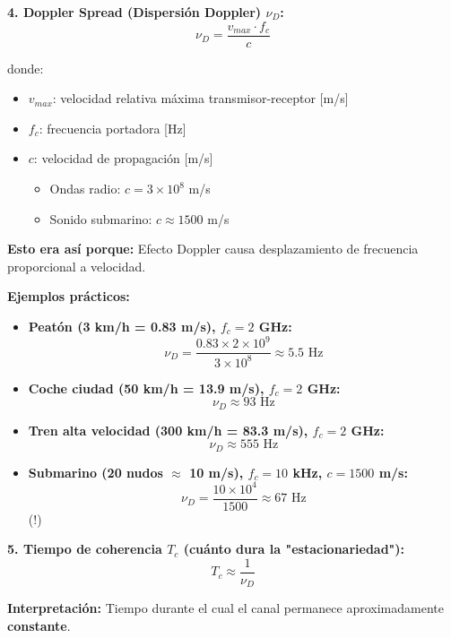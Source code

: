 \documentclass[10pt,a4paper]{article}
\begin{document}
\begin{tcolorbox}[colback=rojoclaro!10,colframe=rojoclaro,title=🚀 Parámetros por MOVILIDAD (Doppler)]
\textbf{4. Doppler Spread (Dispersión Doppler) $\nu_D$:}
$$\boxed{\nu_D = \frac{v_{max} \cdot f_c}{c}}$$

donde:
\begin{itemize}
\item $v_{max}$: velocidad relativa máxima transmisor-receptor [m/s]
\item $f_c$: frecuencia portadora [Hz]
\item $c$: velocidad de propagación [m/s]
  \begin{itemize}
  \item Ondas radio: $c = 3 \times 10^8$ m/s
  \item Sonido submarino: $c \approx 1500$ m/s
  \end{itemize}
\end{itemize}

\textbf{Esto era así porque:} Efecto Doppler causa desplazamiento de frecuencia proporcional a velocidad.

\textbf{Ejemplos prácticos:}
\begin{itemize}
\item \textbf{Peatón (3 km/h = 0.83 m/s), $f_c = 2$ GHz:}
  $$\nu_D = \frac{0.83 \times 2 \times 10^9}{3 \times 10^8} \approx 5.5 \text{ Hz}$$
\item \textbf{Coche ciudad (50 km/h = 13.9 m/s), $f_c = 2$ GHz:}
  $$\nu_D \approx 93 \text{ Hz}$$
\item \textbf{Tren alta velocidad (300 km/h = 83.3 m/s), $f_c = 2$ GHz:}
  $$\nu_D \approx 555 \text{ Hz}$$
\item \textbf{Submarino (20 nudos $\approx$ 10 m/s), $f_c = 10$ kHz, $c = 1500$ m/s:}
  $$\nu_D = \frac{10 \times 10^4}{1500} \approx 67 \text{ Hz}$$ (!)
\end{itemize}

\textbf{5. Tiempo de coherencia $T_c$ (cuánto dura la "estacionariedad"):}
$$\boxed{T_c \approx \frac{1}{\nu_D}}$$

\textbf{Interpretación:} Tiempo durante el cual el canal permanece aproximadamente \textbf{constante}.


\end{tcolorbox}
\end{document}
